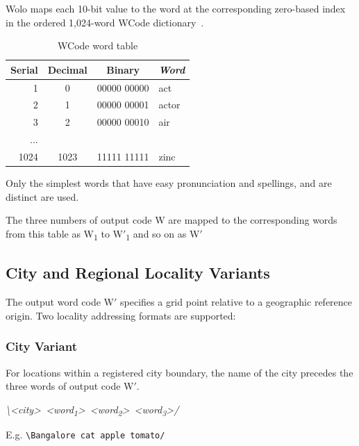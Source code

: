 \documentclass[conference]{IEEEtran}
\begin{document}
Wolo maps each 10-bit value to the word at the corresponding zero-based index in the ordered 1,024-word WCode dictionary~\cite{wordlist}.
\begin{table}[h!]
\caption{WCode word table} \begin{center}
\bgroup
\def\arraystretch{1.4}%
\begin{tabular}{r|c|c|l}
\textbf{Serial} & \textbf{Decimal} & \textbf{Binary} & \textbf{\textit{Word}} \\
\hline
1 & 0 & 00000 00000 & act\\
\hline
2 & 1 & 00000 00001 & actor \\
\hline
3 & 2 & 00000 00010 & air \\
... & & & \\
1024 & 1023 & 11111 11111 & zinc
\end{tabular}
\egroup
\end{center} \end{table}

Only the simplest words that have easy pronunciation and spellings, and are distinct are used.

The three numbers of output code W are mapped to the corresponding words from this table as W\textsubscript{1} to W$'$\textsubscript{1} and so on as W$'$
\subsection{City and Regional Locality Variants}
The output word code W$'$ specifies a grid point relative to a geographic reference origin. Two locality addressing formats are supported:

\subsubsection{City Variant}
For locations within a registered city boundary, the name of the city precedes the three words of output code W$'$.
\begin{center}
\textit{\textbackslash{}\hspace{0.55em}\textless city\textgreater\ \textless word\textsubscript{1}\textgreater\ \textless word\textsubscript{2}\textgreater\ \textless word\textsubscript{3}\textgreater\hspace{0.55em}/}
\end{center}
E.g. \texttt{\textbackslash{}\hspace{0.55em}Bangalore cat apple tomato\hspace{0.55em}/}
\end{document}

